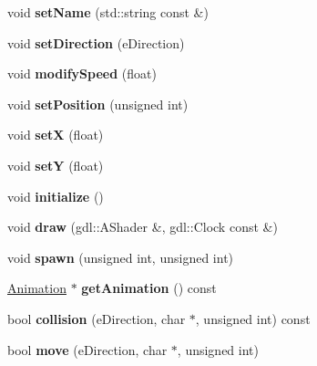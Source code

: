 \begin{DoxyCompactItemize}
\item 
\hypertarget{class_bomberman_ac0fdb90feffec11a569a3b55c4bf9f6f}{}void {\bfseries set\+Name} (std\+::string const \&)\label{class_bomberman_ac0fdb90feffec11a569a3b55c4bf9f6f}

\item 
\hypertarget{class_bomberman_aa0a2f23c43d98cac8525dfd84e225df0}{}void {\bfseries set\+Direction} (e\+Direction)\label{class_bomberman_aa0a2f23c43d98cac8525dfd84e225df0}

\item 
\hypertarget{class_bomberman_a0dda32b0243ce08a2ee351b764d02201}{}void {\bfseries modify\+Speed} (float)\label{class_bomberman_a0dda32b0243ce08a2ee351b764d02201}

\item 
\hypertarget{class_bomberman_a00139cbb6706903413cf19cbc022ed93}{}void {\bfseries set\+Position} (unsigned int)\label{class_bomberman_a00139cbb6706903413cf19cbc022ed93}

\item 
\hypertarget{class_bomberman_a7a20323392cabb644b3744d8fdccf3a9}{}void {\bfseries set\+X} (float)\label{class_bomberman_a7a20323392cabb644b3744d8fdccf3a9}

\item 
\hypertarget{class_bomberman_af24e0804d21938288cebe682a7b233c0}{}void {\bfseries set\+Y} (float)\label{class_bomberman_af24e0804d21938288cebe682a7b233c0}

\item 
\hypertarget{class_bomberman_a480e3b837e454025060c63535d9f106c}{}void {\bfseries initialize} ()\label{class_bomberman_a480e3b837e454025060c63535d9f106c}

\item 
\hypertarget{class_bomberman_a61cb9e6b3f72994e5d189fedfb3ab3e8}{}void {\bfseries draw} (gdl\+::\+A\+Shader \&, gdl\+::\+Clock const \&)\label{class_bomberman_a61cb9e6b3f72994e5d189fedfb3ab3e8}

\item 
\hypertarget{class_bomberman_a2ca2204923ed6635d9f4708faab97e7e}{}void {\bfseries spawn} (unsigned int, unsigned int)\label{class_bomberman_a2ca2204923ed6635d9f4708faab97e7e}

\item 
\hypertarget{class_bomberman_af360d403d987daeeb0b2234cb42b866e}{}\hyperlink{class_animation}{Animation} $\ast$ {\bfseries get\+Animation} () const \label{class_bomberman_af360d403d987daeeb0b2234cb42b866e}

\item 
\hypertarget{class_bomberman_aa4fa9f888df27a6c4acd7f2ead423e88}{}bool {\bfseries collision} (e\+Direction, char $\ast$, unsigned int) const \label{class_bomberman_aa4fa9f888df27a6c4acd7f2ead423e88}

\item 
\hypertarget{class_bomberman_acc98e2ff1ab4751bc45bec093af069fb}{}bool {\bfseries move} (e\+Direction, char $\ast$, unsigned int)\label{class_bomberman_acc98e2ff1ab4751bc45bec093af069fb}

\end{DoxyCompactItemize}
